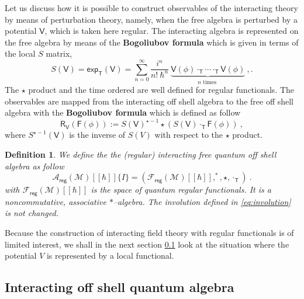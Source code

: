 \documentclass[11pt]{book}
\newcommand{\reg}{\mathsf{reg}}
\renewcommand{\exp}{\mathsf{exp}}
\newcommand{\Acal}{\mathcal{A}}
\newcommand{\Fcal}{\mathcal{F}}
\newcommand{\Mcal}{\mathcal{M}}
\newcommand{\Fsf}{\mathsf{F}}
\newcommand{\Rsf}{\mathsf{R}}
\newcommand{\Tsf}{\mathsf{T}}
\newcommand{\Vsf}{\mathsf{V}}
\theoremstyle{break}
\newtheorem{definition}{Definition}[chapter]
\begin{document}
Let us discuss how it is possible to construct observables of the interacting theory by means of perturbation theory, namely, when the free algebra is perturbed by a potential $\Vsf$, which is taken here regular. The interacting algebra is represented on the free algebra by means of the \textbf{Bogoliubov formula} which is given in terms of the local $S$ matrix, 
%
\begin{equation}
S(\Vsf) = \exp_\Tsf\left(\Vsf\right) = \sum^\infty_{n=0} \frac{i^n}{n!\ \hbar^n} \ \underbrace{\Vsf(\phi) \cdot_\Tsf \cdots \cdot_\Tsf \Vsf(\phi)}_{n \mbox{ times }} \ ,.
\label{eq:S_matrix}
\end{equation}
%
The $\star$ product and the time ordered are well defined for regular functionals. The observables are mapped from the interacting off shell algebra to the free off shell algebra with the \textbf{Bogoliubov formula} \cite{DF_2004} which is defined as follow
%
\begin{equation}
\Rsf_\Vsf(\Fsf(\phi)) := S(\Vsf)^{\star-1} \star \left( S(\Vsf) \cdot_\Tsf \Fsf(\phi) \right) \ ,
\label{eq:bogoliubov}
\end{equation}
%
where $S^{\star-1}(\Vsf)$ is the inverse of $S(V)$ with respect to the $\star$ product. 


\begin{definition}\label{def:alg_qT_reg}
We define the the (regular) interacting free quantum off shell algebra as follow
%
\begin{equation*}
\Acal_\reg(\Mcal)[[\hbar]]\{I\} = \left(\Fcal_\reg(\Mcal)[[\hbar]] , ^\ast , \star , \cdot_\Tsf \right) \ . 
\end{equation*}
%
with $\Fcal_\reg(\Mcal)[[\hbar]]$ is the space of quantum regular functionals. It is a noncommutative, associative $\ast$--algebra. The involution defined in \eqref{eq:involution} is not changed. 
\end{definition}


Because the construction of interacting field theory with regular functionals is of limited interest, we shall in the next section \ref{p:INT_Q_ALG} look at the situation where the potential $V$ is represented by a local functional.


\subsection{Interacting off shell quantum algebra}
\label{p:INT_Q_ALG}
\end{document}
